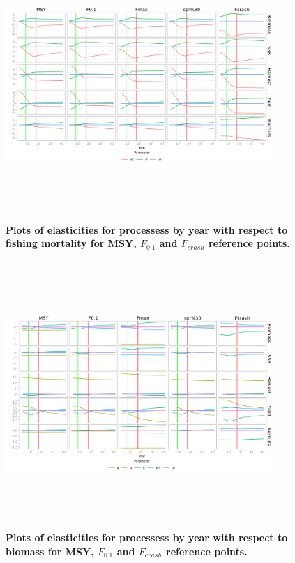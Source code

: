 \documentclass[10pt]{article}
\begin{document}
\begin{figure}[!ht]
\begin{center}
\includegraphics[height=4in, width=4in]{fig5.png}
\caption{\bf{Plots of elasticities for processess by year with respect to fishing mortality for  MSY, $F_{0.1}$ and $F_{crash}$ reference points.}}
\end{center}
\label{Figure_label_5}
\end{figure}

\begin{figure}[!ht]
\begin{center}
\includegraphics[height=4in, width=4in]{fig6.png}
\caption{\bf{Plots of elasticities for processess by year with respect to biomass for  MSY, $F_{0.1}$ and $F_{crash}$ reference points.}}
\end{center}
\label{Figure_label_6}
\end{figure}
\end{document}
